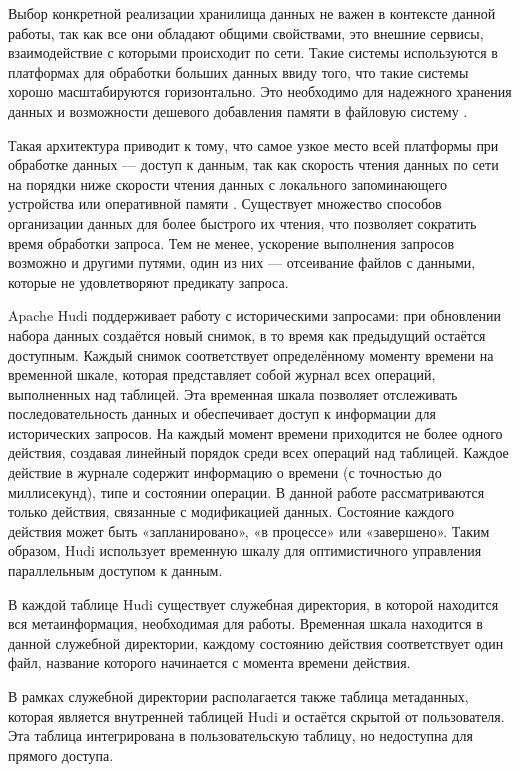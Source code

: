 Выбор конкретной реализации хранилища данных не важен в контексте данной работы, так как все они обладают общими свойствами, это внешние сервисы, взаимодействие с которыми происходит по сети. Такие системы используются в платформах для обработки больших данных ввиду того, что такие системы хорошо масштабируются горизонтально. Это необходимо для надежного хранения данных и возможности дешевого добавления памяти в файловую систему \cite{Distributed_File_Systems_Architectures}.

Такая архитектура приводит к тому, что самое узкое место всей платформы при обработке данных --- доступ к данным, так как скорость чтения данных по сети на порядки ниже скорости чтения данных с локального запоминающего устройства или оперативной памяти \cite{HOI_BigData}. Существует множество способов организации данных для более быстрого их чтения, что позволяет сократить время обработки запроса. Тем не менее, ускорение выполнения запросов возможно и другими путями, один из них --- отсеивание файлов с данными, которые не удовлетворяют предикату запроса.

Apache Hudi поддерживает работу с историческими запросами: при обновлении набора данных создаётся новый снимок, в то время как предыдущий остаётся доступным. Каждый снимок соответствует определённому моменту времени на временной шкале, которая представляет собой журнал всех операций, выполненных над таблицей. Эта временная шкала позволяет отслеживать последовательность данных и обеспечивает доступ к информации для исторических запросов. На каждый момент времени приходится не более одного действия, создавая линейный порядок среди всех операций над таблицей. Каждое действие в журнале содержит информацию о времени (с точностью до миллисекунд), типе и состоянии операции. В данной работе рассматриваются только действия, связанные с модификацией данных. Состояние каждого действия может быть «запланировано», «в процессе» или «завершено». Таким образом, Hudi использует временную шкалу для оптимистичного управления параллельным доступом к данным.

В каждой таблице Hudi существует служебная директория, в которой находится вся метаинформация, необходимая для работы. Временная шкала находится в данной служебной директории, каждому состоянию действия соответствует один файл, название которого начинается с момента времени действия.

В рамках служебной директории располагается также таблица метаданных, которая является внутренней таблицей Hudi и остаётся скрытой от пользователя. Эта таблица интегрирована в пользовательскую таблицу, но недоступна для прямого доступа.

